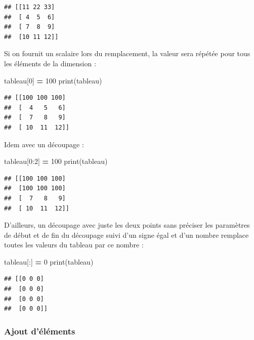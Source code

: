 \documentclass[
  12pt,
]{book}
\newenvironment{Shaded}{\begin{snugshade}}{\end{snugshade}}
\newcommand{\BuiltInTok}[1]{#1}
\newcommand{\DecValTok}[1]{\textcolor[rgb]{0.00,0.00,0.81}{#1}}
\newcommand{\NormalTok}[1]{#1}
\newcommand{\OperatorTok}[1]{\textcolor[rgb]{0.81,0.36,0.00}{\textbf{#1}}}
\numberwithin{equation}{section}
\numberwithin{countremarque}{section}
\begin{document}
\begin{lstlisting}
## [[11 22 33]
##  [ 4  5  6]
##  [ 7  8  9]
##  [10 11 12]]
\end{lstlisting}

Si on fournit un scalaire lors du remplacement, la valeur sera répétée pour tous les éléments de la dimension :

\begin{Shaded}
\begin{Highlighting}[]
\NormalTok{tableau[}\DecValTok{0}\NormalTok{] }\OperatorTok{=} \DecValTok{100}
\BuiltInTok{print}\NormalTok{(tableau)}
\end{Highlighting}
\end{Shaded}

\begin{lstlisting}
## [[100 100 100]
##  [  4   5   6]
##  [  7   8   9]
##  [ 10  11  12]]
\end{lstlisting}

Idem avec un découpage :

\begin{Shaded}
\begin{Highlighting}[]
\NormalTok{tableau[}\DecValTok{0}\NormalTok{:}\DecValTok{2}\NormalTok{] }\OperatorTok{=} \DecValTok{100}
\BuiltInTok{print}\NormalTok{(tableau)}
\end{Highlighting}
\end{Shaded}

\begin{lstlisting}
## [[100 100 100]
##  [100 100 100]
##  [  7   8   9]
##  [ 10  11  12]]
\end{lstlisting}

D'ailleurs, un découpage avec juste les deux points sans préciser les paramètres de début et de fin du découpage suivi d'un signe égal et d'un nombre remplace toutes les valeurs du tableau par ce nombre :

\begin{Shaded}
\begin{Highlighting}[]
\NormalTok{tableau[:] }\OperatorTok{=} \DecValTok{0}
\BuiltInTok{print}\NormalTok{(tableau)}
\end{Highlighting}
\end{Shaded}

\begin{lstlisting}
## [[0 0 0]
##  [0 0 0]
##  [0 0 0]
##  [0 0 0]]
\end{lstlisting}

\subsubsection{Ajout d'éléments}\label{ajout-duxe9luxe9ments-2}
\end{document}
